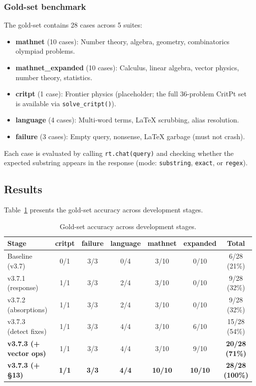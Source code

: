 \documentclass[11pt,a4paper]{article}
\begin{document}
\subsubsection{Gold-set benchmark}
The gold-set contains 28 cases across 5 suites:
\begin{itemize}
    \item \textbf{mathnet} (10 cases): Number theory, algebra, geometry, combinatorics olympiad problems.
    \item \textbf{mathnet\_expanded} (10 cases): Calculus, linear algebra, vector physics, number theory, statistics.
    \item \textbf{critpt} (1 case): Frontier physics (placeholder; the full 36-problem CritPt set is available via \texttt{solve\_critpt()}).
    \item \textbf{language} (4 cases): Multi-word terms, LaTeX scrubbing, alias resolution.
    \item \textbf{failure} (3 cases): Empty query, nonsense, LaTeX garbage (must not crash).
\end{itemize}

Each case is evaluated by calling \texttt{rt.chat(query)} and checking whether the expected substring appears in the response (mode: \texttt{substring}, \texttt{exact}, or \texttt{regex}).

\subsection{Results}

Table~\ref{tab:results} presents the gold-set accuracy across development stages.

\begin{table}[htbp]
\centering
\caption{Gold-set accuracy across development stages.}
\label{tab:results}
\begin{tabular}{lcccccc}
\toprule
\textbf{Stage} & \textbf{critpt} & \textbf{failure} & \textbf{language} & \textbf{mathnet} & \textbf{expanded} & \textbf{Total} \\
\midrule
Baseline (v3.7) & 0/1 & 3/3 & 0/4 & 3/10 & 0/10 & 6/28 (21\%) \\
v3.7.1 (response) & 1/1 & 3/3 & 2/4 & 3/10 & 0/10 & 9/28 (32\%) \\
v3.7.2 (absorptions) & 1/1 & 3/3 & 2/4 & 3/10 & 0/10 & 9/28 (32\%) \\
v3.7.3 (detect fixes) & 1/1 & 3/3 & 4/4 & 3/10 & 6/10 & 15/28 (54\%) \\
\textbf{v3.7.3 (+ vector ops)} & 1/1 & 3/3 & 4/4 & 3/10 & 9/10 & \textbf{20/28 (71\%)} \\
\textbf{v3.7.3 (+ \S13)} & \textbf{1/1} & \textbf{3/3} & \textbf{4/4} & \textbf{10/10} & \textbf{10/10} & \textbf{28/28 (100\%)} \\
\bottomrule
\end{tabular}
\end{table}
\end{document}
